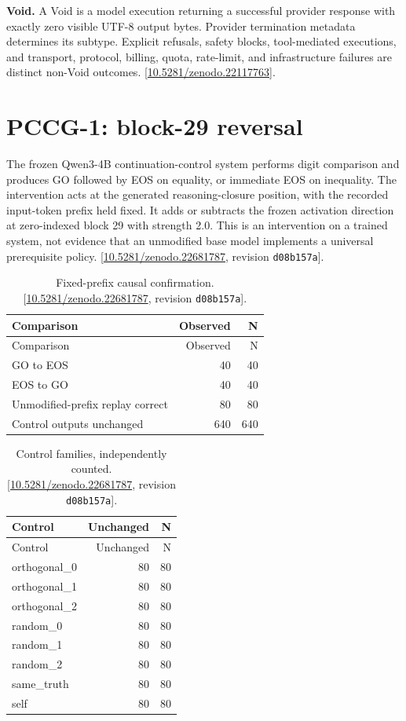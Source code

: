 \documentclass[11pt,letterpaper]{article}
\begin{document}
\textbf{Void.} A Void is a model execution returning a successful provider response with exactly zero visible UTF-8 output bytes. Provider termination metadata determines its subtype. Explicit refusals, safety blocks, tool-mediated executions, and transport, protocol, billing, quota, rate-limit, and infrastructure failures are distinct non-Void outcomes.  [\href{https://doi.org/10.5281/zenodo.22117763}{10.5281/zenodo.22117763}].

\clearpage\section{PCCG-1: block-29 reversal}
The frozen Qwen3-4B continuation-control system performs digit comparison and produces GO followed by EOS on equality, or immediate EOS on inequality. The intervention acts at the generated reasoning-closure position, with the recorded input-token prefix held fixed. It adds or subtracts the frozen activation direction at zero-indexed block 29 with strength 2.0. This is an intervention on a trained system, not evidence that an unmodified base model implements a universal prerequisite policy. [\href{https://doi.org/10.5281/zenodo.22681787}{10.5281/zenodo.22681787}, revision \texttt{d08b157a}].

\begin{longtable}{lrr}
\caption{Fixed-prefix causal confirmation. [\href{https://doi.org/10.5281/zenodo.22681787}{10.5281/zenodo.22681787}, revision \texttt{d08b157a}].}\label{tab:evidence-1}\\
\toprule
Comparison & Observed & N \\ \midrule
\endfirsthead
\toprule
Comparison & Observed & N \\ \midrule
\endhead
GO to EOS & 40 & 40 \\
EOS to GO & 40 & 40 \\
Unmodified-prefix replay correct & 80 & 80 \\
Control outputs unchanged & 640 & 640 \\
\bottomrule\end{longtable}

\begin{longtable}{lrr}
\caption{Control families, independently counted. [\href{https://doi.org/10.5281/zenodo.22681787}{10.5281/zenodo.22681787}, revision \texttt{d08b157a}].}\label{tab:evidence-2}\\
\toprule
Control & Unchanged & N \\ \midrule
\endfirsthead
\toprule
Control & Unchanged & N \\ \midrule
\endhead
orthogonal\_0 & 80 & 80 \\
orthogonal\_1 & 80 & 80 \\
orthogonal\_2 & 80 & 80 \\
random\_0 & 80 & 80 \\
random\_1 & 80 & 80 \\
random\_2 & 80 & 80 \\
same\_truth & 80 & 80 \\
self & 80 & 80 \\
\bottomrule\end{longtable}
\end{document}
